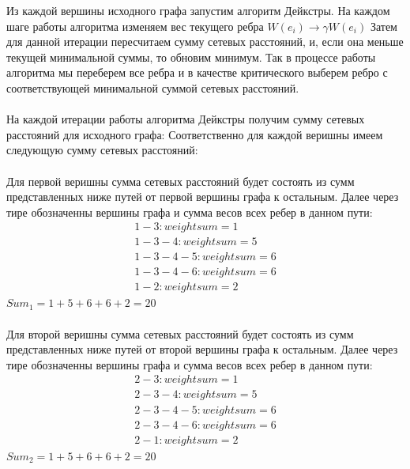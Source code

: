 \documentclass[12pt]{article}
\begin{document}
Из каждой вершины исходного графа запустим алгоритм Дейкстры.
На каждом шаге работы алгоритма изменяем вес текущего ребра $W(e_i) \rightarrow \gamma W(e_i)$
Затем для данной итерации пересчитаем сумму сетевых расстояний, и, если она меньше текущей минимальной суммы,
то обновим минимум. Так в процессе работы алгоритма мы переберем все ребра и в качестве критического выберем 
ребро с соответствующей минимальной суммой сетевых расстояний. 

\paragraph{}

На каждой итерации работы алгоритма Дейкстры получим сумму сетевых расстояний для исходного графа:
Соответственно для каждой веришны имеем следующую сумму сетевых расстояний:

\paragraph{}

Для первой веришны сумма сетевых расстояний будет состоять из сумм представленных ниже 
путей от первой вершины графа к остальным.
Далее через тире обозначенны вершины графа и сумма весов всех ребер в данном пути:
\begin{gather}
1 - 3 : weight sum = 1 \\
1 - 3 - 4 : weight sum = 5 \\
1 - 3 - 4 - 5 : weight sum = 6 \\
1 - 3 - 4 - 6 : weight sum = 6 \\
1 - 2 : weight sum = 2
\end{gather}
$Sum_1 = 1 + 5 + 6 + 6 + 2 = 20$

\paragraph{}

Для второй веришны сумма сетевых расстояний будет состоять из сумм представленных ниже 
путей от второй вершины графа к остальным.
Далее через тире обозначенны вершины графа и сумма весов всех ребер в данном пути:
\begin{gather}
2 - 3 : weight sum = 1 \\
2 - 3 - 4 : weight sum = 5 \\
2 - 3 - 4 - 5 : weight sum = 6 \\
2 - 3 - 4 - 6 : weight sum = 6 \\
2 - 1 : weight sum = 2
\end{gather}
$Sum_2 = 1 + 5 + 6 + 6 + 2 = 20$
\end{document}
